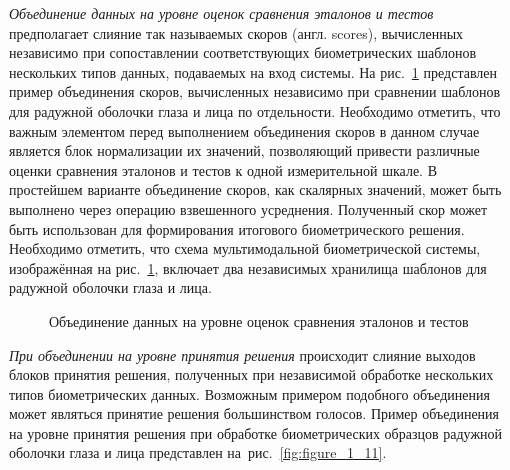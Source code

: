 \documentclass[12pt]{book}
\begin{document}
{\large{\textit{Объединение данных на уровне оценок сравнения эталонов и тестов} предполагает слияние так называемых скоров (англ. scores), вычисленных независимо при сопоставлении соответствующих биометрических шаблонов нескольких типов данных, подаваемых на вход системы. На рис.~\ref{fig:figure_1_10} представлен пример объединения скоров, вычисленных независимо при сравнении шаблонов для радужной оболочки глаза и лица по отдельности. Необходимо отметить, что важным элементом перед выполнением объединения скоров в данном случае является блок нормализации их значений, позволяющий привести различные оценки сравнения эталонов и тестов к одной измерительной шкале. В простейшем варианте объединение скоров, как скалярных значений, может быть выполнено через операцию взвешенного усреднения. Полученный скор может быть использован для формирования итогового биометрического решения. Необходимо отметить, что схема мультимодальной биометрической системы, изображённая на рис.~\ref{fig:figure_1_10}, включает два независимых хранилища шаблонов для радужной оболочки глаза и лица.}

\begin{figure}[h]
\caption{Объединение данных на уровне оценок сравнения эталонов и тестов}
\label{fig:figure_1_10}
\end{figure}

\large{\textit{При объединении на уровне принятия решения} происходит слияние выходов блоков принятия решения, полученных при независимой обработке нескольких типов биометрических данных. Возможным примером подобного объединения может являться принятие решения большинством голосов. Пример объединения на уровне принятия решения при обработке биометрических образцов радужной оболочки глаза и лица представлен на~рис.~\ref{fig:figure_1_11}.}

}
\end{document}
